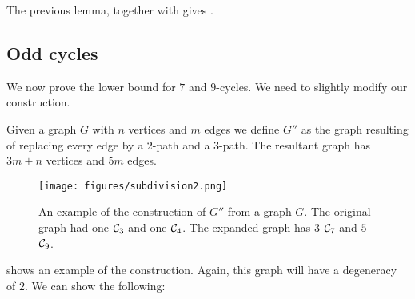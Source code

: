\documentclass[a4paper,UKenglish,cleveref, autoref, numberwithinsect, thm-restate]{lipics-v2021}
\newcommand{\cycle}[1]{\cC_{#1}}
\newcommand{\expandGOdd}{G''}
\newcommand{\cC}{{\cal C}}
\begin{document}
		The previous lemma, together with  gives .

		\fivecycle*
		
		\subsection{Odd cycles}
		
		We now prove the lower bound for $7$ and $9$-cycles. We need to slightly modify our construction.
		
		\begin{definition} 
			Given a graph $G$ with $n$ vertices and $m$ edges we define $\expandGOdd$ as the graph resulting of replacing every edge by a $2$-path and a $3$-path. The resultant graph has $3m+n$ vertices and $5m$ edges.
		\end{definition}
		
		\begin{figure}
			\centering
			\texttt{[image: figures/subdivision2.png]}\caption{An example of the construction of $\expandGOdd$ from a graph $G$. The original graph had one $\cycle{3}$ and one $\cycle{4}$. The expanded graph has $3$ $\cycle{7}$ and $5$ $\cycle{9}$.}
			\label{fig:subdivision2}
		\end{figure}
		
		 shows an example of the construction. Again, this graph will have a degeneracy of $2$. We can show the following:
		
\end{document}

